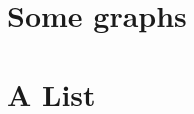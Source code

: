 \documentclass[zihao=-4,heading=true,a4paper,twoside,openany]{ctexbook}
\begin{document}
\section{Some graphs}


\section{A List}




\backmatter

\printbibliography

\begin{small}
	\thispagestyle{empty}
	\onecolumn
	\printindex
\end{small}
\vfill
\eject
\end{document}

